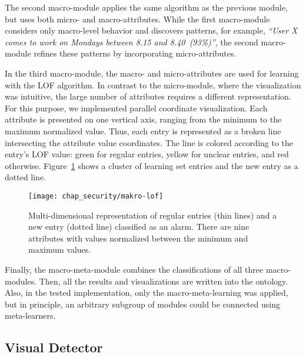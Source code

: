 The second macro-module applies the same algorithm as the previous module, but uses both micro- and macro-attributes. While the first macro-module considers only macro-level behavior and discovers patterns, for example, \textit{``User X comes to work on Mondays between 8.15 and 8.40~(93\%)''}, the second macro-module refines these patterns by incorporating micro-attributes.

In the third macro-module, the macro- and micro-attributes are used for learning with the LOF algorithm. In contrast to the micro-module, where the visualization was intuitive, the large number of attributes requires a different representation. For this purpose, we implemented parallel coordinate visualization. Each attribute is presented on one vertical axis, ranging from the minimum to the maximum normalized value. Thus, each entry is represented as a broken line intersecting the attribute value coordinates. The line is colored according to the entry's LOF value: green for regular entries, yellow for unclear entries, and red otherwise. Figure~\ref{fig:macroLOF} shows a cluster of learning set entries and the new entry as a dotted line.

\begin{figure}[]
\centering
\texttt{[image: chap\_security/makro-lof]}
\caption{Multi-dimensional representation of regular entries (thin lines) and a new entry (dotted line) classified as an alarm. There are nine attributes with values normalized between the minimum and maximum values.}
\label{fig:macroLOF}
\end{figure}


Finally, the macro-meta-module combines the classifications of all three macro-modules. Then, all the results and visualizations are written into the ontology. %
Also, in the tested implementation, only the macro-meta-learning was applied, but in principle, an arbitrary subgroup of modules could be connected using meta-learners. 

\subsection{Visual Detector}
\label{sec:modules:visual}

